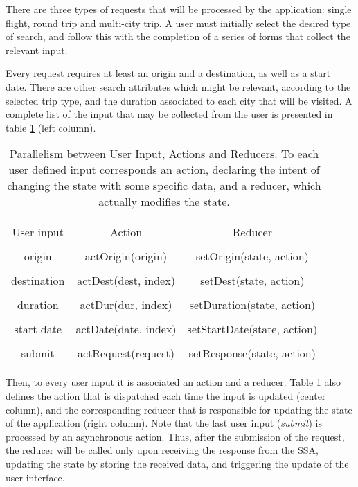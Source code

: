There are three types of requests that will be processed by the application: single flight, round trip and multi-city trip. A user must initially select the desired type of search, and follow this with the completion of a series of forms that collect the relevant input. 

Every request requires at least an origin and a destination, as well as a start date. There are other search attributes which might be relevant, according to the selected trip type, and the duration associated to each city that will be visited. A complete list of the input that may be collected from the user is presented in table \ref{table:input_action_reducer} (left column). 


\begin{table}[htpb]
  \centering
  \caption{Parallelism between User Input, Actions and Reducers. To each user defined input corresponds an 
  action, declaring the intent of changing the state with some specific data, and a reducer, which actually modifies the state. }
  \setlength{\tabcolsep}{8mm}
  \label{table:input_action_reducer}
  \begin{tabular}{ccc}
  \hline
  \\[-0.75em]
  User input  & Action               & Reducer                    \\ \hline
  \\[-0.75em]
  origin      & actOrigin(origin)    & setOrigin(state, action)   \\
  \\[-0.75em]
  destination & actDest(dest, index) & setDest(state, action)     \\
  \\[-0.75em]
  duration    & actDur(dur, index)   & setDuration(state, action)     \\
  \\[-0.75em]
  start date  & actDate(date, index) & setStartDate(state, action)     \\
  \\[-0.75em]
  submit      & actRequest(request)  & setResponse(state, action) \\ \hline
  \end{tabular}
\end{table}


Then, to every user input it is associated an action and a reducer. Table \ref{table:input_action_reducer} also defines the action that is dispatched each time the input is updated (center column), and the corresponding reducer that is responsible for updating the state of the application (right column). Note that the last user input (\textit{submit}) is processed by an asynchronous action. Thus, after the submission of the request, the reducer will be called only upon receiving the response from the SSA, updating the state by storing the received data, and triggering the update of the user interface. 

